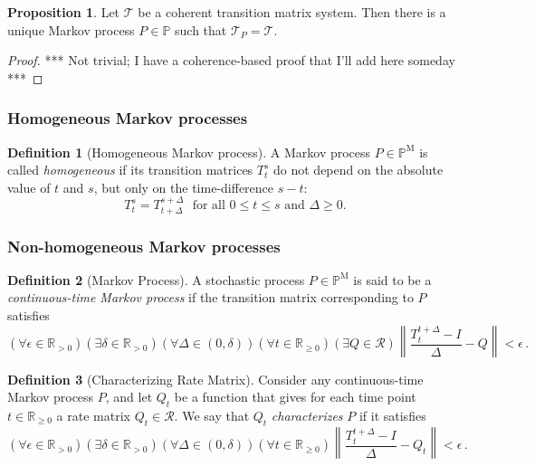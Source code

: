 \documentclass[10pt]{paper}
\theoremstyle{definition}
\newtheorem{proposition}[theorem]{Proposition}
\newtheorem{definition}{Definition}
\newcommand{\reals}{\mathbb{R}}
\newcommand{\realspos}{\reals_{>0}}
\newcommand{\realsnonneg}{\reals_{\geq 0}}
\newcommand{\processes}{\mathbb{P}}
\newcommand{\mprocesses}{\processes^{\mathrm{M}}}
\newcommand{\norm}[1]{\left\lVert #1 \right\rVert}
\begin{document}
\begin{proposition}
Let $\mathcal{T}$ be a coherent transition matrix system. Then there is a unique Markov process $P\in\processes$ such that $\mathcal{T}_P=\mathcal{T}$.
\end{proposition}
\begin{proof}
*** Not trivial; I have a coherence-based proof that I'll add here someday ***
\end{proof}



\subsubsection{Homogeneous Markov processes}

\begin{definition}[Homogeneous Markov process]\label{def:markov_property}
A Markov process $P\in\mprocesses$ is called \emph{homogeneous} if its transition matrices $T_t^s$ do not depend on the absolute value of $t$ and $s$, but only on the time-difference $s-t$:
\begin{equation*}
T_t^s=T_{t+\Delta}^{s+\Delta}
\text{~~for all $0\leq t\leq s$ and $\Delta\geq0$.}
\end{equation*}
\end{definition}



\subsubsection{Non-homogeneous Markov processes}


\begin{definition}[Markov Process]\label{def:markov_process}
A stochastic process $P\in\mprocesses$ is said to be a \emph{continuous-time Markov process} if the transition matrix corresponding to $P$ satisfies
\begin{equation*}
(\forall \epsilon\in\realspos)(\exists \delta\in\realspos)(\forall \Delta\in(0,\delta))(\forall t\in\realsnonneg)(\exists Q\in\mathcal{R}) \norm{\frac{T_t^{t+\Delta} - I}{\Delta} - Q} < \epsilon\,.
\end{equation*}
\end{definition}

\begin{definition}[Characterizing Rate Matrix]\label{def:markov_process_char_matrix}
Consider any continuous-time Markov process $P$, and let $Q_t$ be a function that gives for each time point $t\in\realsnonneg$ a rate matrix $Q_t\in\mathcal{R}$. We say that $Q_t$ \emph{characterizes} $P$ if it satisfies
\begin{equation*}
(\forall \epsilon\in\realspos)(\exists \delta\in\realspos)(\forall \Delta\in(0,\delta))(\forall t\in\realsnonneg)\norm{\frac{T_t^{t+\Delta} - I}{\Delta} - Q_t} < \epsilon\,.
\end{equation*}
\end{definition}
\end{document}
